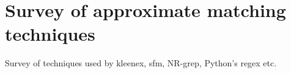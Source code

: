 \section{Survey of approximate matching techniques}

Survey of techniques used by kleenex, sfm, NR-grep, Python's regex etc.
